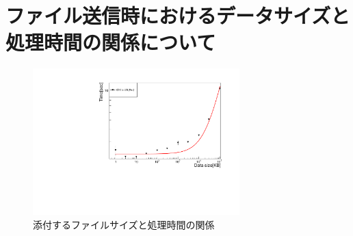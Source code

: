 \chapter{ファイル送信時におけるデータサイズと処理時間の関係について}

\begin{figure}[bpt]\centering
  \begin{center}
    \includegraphics[width=8cm,angle=270]{datasize_vs_time_scp.pdf}
  \caption[添付するファイルサイズと処理時間の関係]{添付するファイルサイズと処理時間の関係}
  \label{datasize_vs_time}
  \end{center}
\end{figure}


